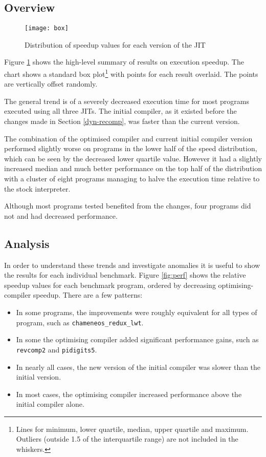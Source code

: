 \subsection{Overview}

\begin{figure}[h]
    \texttt{[image: box]}
    \caption{Distribution of speedup values for each version of the JIT}
    \label{fig:box}
\end{figure}

Figure \ref{fig:box} shows the high-level summary of results on execution speedup. The
chart shows a standard box plot\footnote{Lines for minimum, lower quartile, median, upper quartile
    and maximum. Outliers (outside
    1.5 of the interquartile range) are not included in the whiskers.}
with points for each result overlaid. The points are vertically
offset randomly.

The general trend is of a severely decreased execution time for most programs executed using all
three JITs. The initial compiler, as it existed before the changes made in Section
\ref{dyn-recomp},
was faster than the current version.

The combination of the optimised compiler and current initial compiler version performed slightly
worse on programs in the lower half of the speed distribution, which can be seen by the decreased
lower quartile value.  However it had a slightly increased median and much better performance on
the
top half of the distribution with a cluster of eight programs managing to halve the execution time
relative to the stock interpreter.

Although most programs tested benefited from the changes, four programs did not and had decreased
performance.

\subsection{Analysis}

In order to understand these trends and investigate anomalies it is useful to show the results for
each individual benchmark. Figure \ref{fig:perf} shows the relative speedup values for each
benchmark program, ordered by decreasing optimising-compiler speedup. There are a few patterns:

\begin{itemize}
    \item In some programs, the improvements were roughly equivalent for all types of
          program, such as \texttt{chameneos\_redux\_lwt}.
    \item In some the optimising compiler added significant performance gains, such as
          \texttt{revcomp2} and \texttt{pidigits5}.
    \item In nearly all cases, the new version of the initial compiler was slower than the
          initial
          version.
    \item In most cases, the optimising compiler increased performance above the initial compiler
          alone.
\end{itemize}

